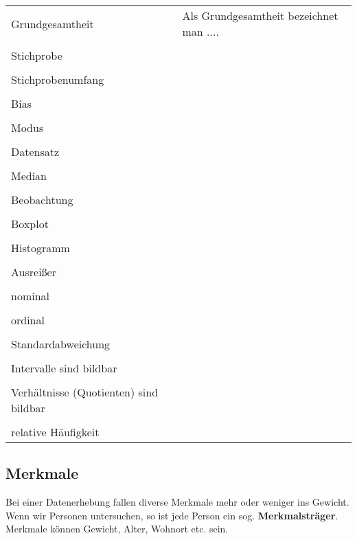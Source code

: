 \begin{tabular}{p{5cm}|l}
  Grundgesamtheit         &  Als Grundgesamtheit bezeichnet man ....\\
  \\
  Stichprobe             & \\
  \\
  Stichprobenumfang       & \\
  \\
  Bias                   & \\
  \\ 
  Modus       & \\
  \\
  Datensatz               & \\
  \\
  Median    & \\
  \\
  Beobachtung             & \\
  \\
  Boxplot      & \\
  \\
  Histogramm          & \\
  \\
  Ausreißer       & \\
  \\
  nominal                & \\
  \\
  ordinal                 & \\
  \\
  Standardabweichung                 & \\
  \\
  Intervalle\index{Intervalle} sind bildbar & \\
  \\
  Verhältnisse\index{Verhältnisse!bildbar} (Quotienten) sind bildbar & \\
  \\ 
  relative Häufigkeit\index{Häufigkeit!relative}     & \\
\end{tabular}%
\newpage


\subsection{Merkmale}
Bei einer Datenerhebung fallen diverse Merkmale mehr oder weniger ins
Gewicht. Wenn wir Personen untersuchen, so ist jede Person ein
sog. \textbf{Merkmalsträger}. Merkmale können Gewicht, Alter, Wohnort
etc. sein.


